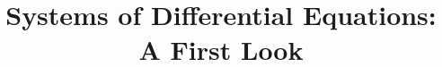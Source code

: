 \documentclass{beamer}
\title[Section 2.6]{Systems of Differential Equations: A First Look}
\begin{document}
\begin{frame}
\titlepage
\end{frame}
\end{document}
